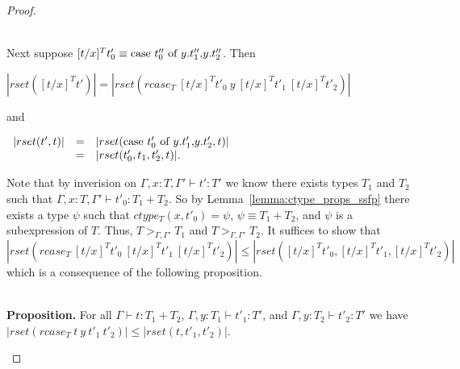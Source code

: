 \begin{proof}
\begin{itemize}
  \ \\
  Next suppose $[t/x]^T t'_0 \equiv \mbox{case}\ t''_0\ \text{of}\ y\text{.}t''_1\text{,}y\text{.}t''_2$.  Then 
  \begin{center}
    \begin{math}
      |rset([t/x]^T t')| = |rset(rcase_{T}\ [t/x]^T t'_0\ y\ [t/x]^T t'_1\ [t/x]^T t'_2)|
    \end{math}
  \end{center}
  and
  \begin{center}
    \begin{math}
      \begin{array}{lll}
        |rset(t', t)| & = & |rset(\mbox{case}\ t'_0\ \text{of}\ y\text{.}t'_1\text{,}y\text{.}t'_2, t)|\\
        & = & |rset(t'_0,t_1,t'_2,t)|.
      \end{array}
    \end{math}
  \end{center}
  Note that by inverision on $\Gamma,x:T,\Gamma' \vdash t':T'$ we know there exists
  types $T_1$ and $T_2$ such that $\Gamma,x:T,\Gamma' \vdash t'_0:T_1+T_2$.
  So by Lemma~\ref{lemma:ctype_props_ssfp} there exists a type $\psi$ such that $ctype_T (x,t'_0) = \psi$, $\psi \equiv T_1+T_2$, and $\psi$ is a 
  subexpression of $T$. Thus, $T >_{\Gamma,\Gamma'} T_1$ and $T >_{\Gamma,\Gamma'} T_2$.
  It suffices to show that $|rset(rcase_T\ [t/x]^T t'_0\ [t/x]^T t'_1\ [t/x]^T t'_2)| \leq |rset([t/x]^T t'_0, [t/x]^T t'_1, [t/x]^T t'_2)|$ which
  is a consequence of the following proposition.
    
  \ \\
  {\bf Proposition.}  For all $\Gamma \vdash t:T_1+T_2$, $\Gamma, y:T_1 \vdash t'_1:T'$, and 
  $\Gamma, y:T_2 \vdash t'_2:T'$ we have $|rset(rcase_{T}\ t\ y\ t'_1\ t'_2)| \leq |rset(t, t'_1, t'_2)|$.
    

\end{itemize}
\end{proof}
